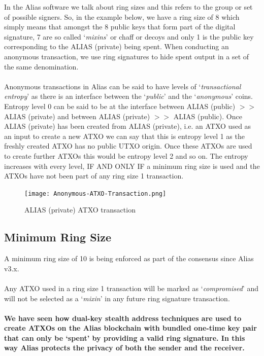 In the Alias software we talk about ring sizes and this refers to the
group or set of possible signers. So, in the example below, we have a ring
size of 8 which simply means that amongst the 8 public keys that form part
of the digital signature, 7 are so called ‘\textit{mixins}’ or chaff or decoys and
only 1 is the public key corresponding to the ALIAS (private) being spent. When
conducting an anonymous transaction, we use ring signatures to hide spent
output in a set of the same denomination.
\\
\\
\noindent
Anonymous transactions in Alias can be said to have levels of
‘\textit{transactional entropy}’ as there is an interface between the ‘\textit{public}’
and the ‘\textit{anonymous}’ coins. Entropy level 0 can be said to be at the
interface between ALIAS (public) $>>$ ALIAS (private) and between ALIAS (private) $>>$ ALIAS (public). Once
ALIAS (private) has been created from ALIAS (private), i.e. an ATXO used as an input to
create a new ATXO we can say that this is entropy level 1 as the freshly
created ATXO has no public UTXO origin. Once these ATXOs are used to
create further ATXOs this would be entropy level 2 and so on. The entropy
increases with every level, IF AND ONLY IF a minimum ring size is used and
the ATXOs have not been part of any ring size 1 transaction.
\newpage

\begin{figure}[ht]
	\centering
	\texttt{[image: Anonymous-ATXO-Transaction.png]}
	\caption{ALIAS (private) ATXO transaction}
\end{figure}




\subsection{Minimum Ring Size}

A minimum ring size of 10 is being enforced as part of the consensus since 
Alias v3.x.
\\
\\
\noindent
Any ATXO used in a ring size 1 transaction will be marked as 
‘\textit{compromised}’ and will not be selected as a ‘\textit{mixin}’ 
in any future ring signature transaction.
\\
\\
\noindent
\textbf{We have seen how dual-key stealth address techniques are used to 
create ATXOs on the Alias blockchain with bundled one-time key pair 
that can only be ‘spent’ by providing a valid ring signature. In this way 
Alias protects the privacy of both the sender and the receiver.}



